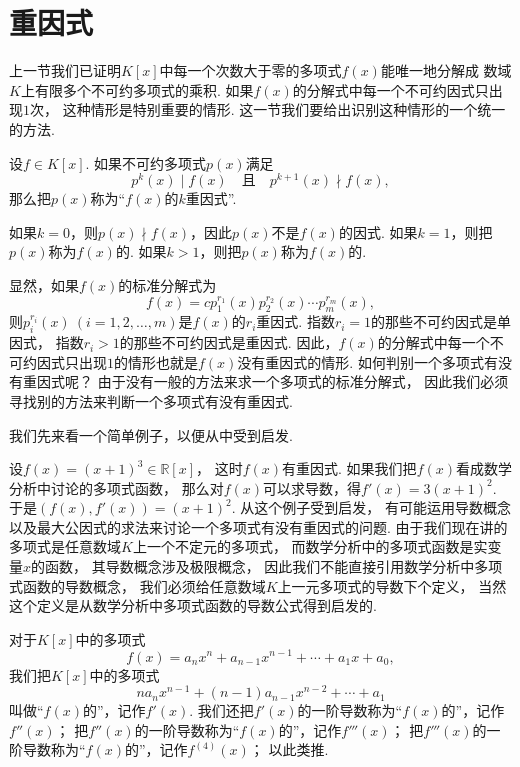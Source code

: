 \section{重因式}
上一节我们已证明\(K[x]\)中每一个次数大于零的多项式\(f(x)\)能唯一地分解成
数域\(K\)上有限多个不可约多项式的乘积.
如果\(f(x)\)的分解式中每一个不可约因式只出现\(1\)次，
这种情形是特别重要的情形.
这一节我们要给出识别这种情形的一个统一的方法.

\begin{definition}
设\(f \in K[x]\).
如果不可约多项式\(p(x)\)满足\[
	p^k(x) \mid f(x)
	\quad\text{且}\quad
	p^{k+1}(x) \nmid f(x),
\]
那么把\(p(x)\)称为“\(f(x)\)的\(k\)重因式”.

如果\(k=0\)，则\(p(x) \nmid f(x)\)，因此\(p(x)\)不是\(f(x)\)的因式.
如果\(k=1\)，则把\(p(x)\)称为\(f(x)\)的.
如果\(k>1\)，则把\(p(x)\)称为\(f(x)\)的.
\end{definition}

显然，如果\(f(x)\)的标准分解式为\[
	f(x) = c p_1^{r_1}(x) p_2^{r_2}(x) \dotsm p_m^{r_m}(x),
\]
则\(p_i^{r_i}(x)\ (i=1,2,\dotsc,m)\)是\(f(x)\)的\(r_i\)重因式.
指数\(r_i = 1\)的那些不可约因式是单因式，
指数\(r_i > 1\)的那些不可约因式是重因式.
因此，\(f(x)\)的分解式中每一个不可约因式只出现\(1\)的情形也就是\(f(x)\)没有重因式的情形.
如何判别一个多项式有没有重因式呢？
由于没有一般的方法来求一个多项式的标准分解式，
因此我们必须寻找别的方法来判断一个多项式有没有重因式.

我们先来看一个简单例子，以便从中受到启发.

设\(f(x) = (x+1)^3 \in \mathbb{R}[x]\)，
这时\(f(x)\)有重因式.
如果我们把\(f(x)\)看成数学分析中讨论的多项式函数，
那么对\(f(x)\)可以求导数，得\(f'(x) = 3(x+1)^2\).
于是\((f(x),f'(x)) = (x+1)^2\).
从这个例子受到启发，
有可能运用导数概念以及最大公因式的求法来讨论一个多项式有没有重因式的问题.
由于我们现在讲的多项式是任意数域\(K\)上一个不定元的多项式，
而数学分析中的多项式函数是实变量\(x\)的函数，
其导数概念涉及极限概念，
因此我们不能直接引用数学分析中多项式函数的导数概念，
我们必须给任意数域\(K\)上一元多项式的导数下个定义，
当然这个定义是从数学分析中多项式函数的导数公式得到启发的.

\begin{definition}\label{definition:多项式.导数}
对于\(K[x]\)中的多项式\[
	f(x) = a_n x^n + a_{n-1} x^{n-1} + \dotsb + a_1 x + a_0,
\]
我们把\(K[x]\)中的多项式\[
	n a_n x^{n-1} + (n-1) a_{n-1} x^{n-2} + \dotsb + a_1
\]
叫做“\(f(x)\)的”，记作\(f'(x)\).
我们还把\(f'(x)\)的一阶导数称为“\(f(x)\)的”，记作\(f''(x)\)；
把\(f''(x)\)的一阶导数称为“\(f(x)\)的”，记作\(f'''(x)\)；
把\(f'''(x)\)的一阶导数称为“\(f(x)\)的”，记作\(f^{(4)}(x)\)；
以此类推.
\end{definition}

